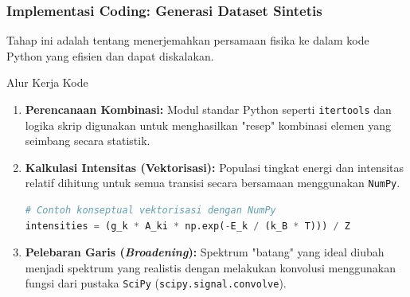 \documentclass{beamer}
\begin{document}
\begin{frame}
  \frametitle{Implementasi Coding: Generasi Dataset Sintetis}
  
  Tahap ini adalah tentang menerjemahkan persamaan fisika ke dalam kode Python yang efisien dan dapat diskalakan.
  
  \begin{block}{Alur Kerja Kode}
    \begin{enumerate}
      \item \textbf{Perencanaan Kombinasi:} Modul standar Python seperti \texttt{itertools} dan logika skrip digunakan untuk menghasilkan "resep" kombinasi elemen yang seimbang secara statistik.
      
      \item \textbf{Kalkulasi Intensitas (Vektorisasi):} Populasi tingkat energi dan intensitas relatif dihitung untuk semua transisi secara bersamaan menggunakan \texttt{NumPy}.
      \begin{lstlisting}[language=Python]
# Contoh konseptual vektorisasi dengan NumPy
intensities = (g_k * A_ki * np.exp(-E_k / (k_B * T))) / Z
      \end{lstlisting}
      
      \item \textbf{Pelebaran Garis (\textit{Broadening}):} Spektrum "batang" yang ideal diubah menjadi spektrum yang realistis dengan melakukan konvolusi menggunakan fungsi dari pustaka \texttt{SciPy} (\texttt{scipy.signal.convolve}).
    \end{enumerate}
  \end{block}
\end{frame}
\end{document}
